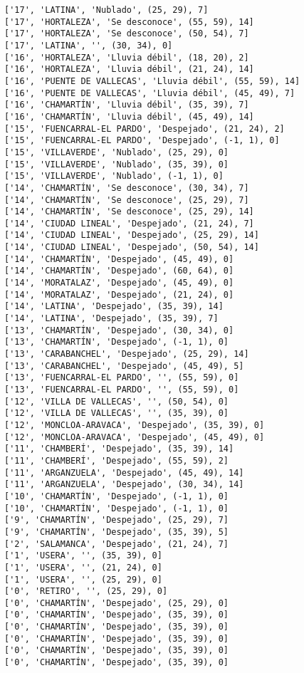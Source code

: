 \documentclass[11pt]{article}
\begin{document}
\begin{Verbatim}[commandchars=\\\{\}]
['17', 'LATINA', 'Nublado', (25, 29), 7]
['17', 'HORTALEZA', 'Se desconoce', (55, 59), 14]
['17', 'HORTALEZA', 'Se desconoce', (50, 54), 7]
['17', 'LATINA', '', (30, 34), 0]
['16', 'HORTALEZA', 'Lluvia débil', (18, 20), 2]
['16', 'HORTALEZA', 'Lluvia débil', (21, 24), 14]
['16', 'PUENTE DE VALLECAS', 'Lluvia débil', (55, 59), 14]
['16', 'PUENTE DE VALLECAS', 'Lluvia débil', (45, 49), 7]
['16', 'CHAMARTÍN', 'Lluvia débil', (35, 39), 7]
['16', 'CHAMARTÍN', 'Lluvia débil', (45, 49), 14]
['15', 'FUENCARRAL-EL PARDO', 'Despejado', (21, 24), 2]
['15', 'FUENCARRAL-EL PARDO', 'Despejado', (-1, 1), 0]
['15', 'VILLAVERDE', 'Nublado', (25, 29), 0]
['15', 'VILLAVERDE', 'Nublado', (35, 39), 0]
['15', 'VILLAVERDE', 'Nublado', (-1, 1), 0]
['14', 'CHAMARTÍN', 'Se desconoce', (30, 34), 7]
['14', 'CHAMARTÍN', 'Se desconoce', (25, 29), 7]
['14', 'CHAMARTÍN', 'Se desconoce', (25, 29), 14]
['14', 'CIUDAD LINEAL', 'Despejado', (21, 24), 7]
['14', 'CIUDAD LINEAL', 'Despejado', (25, 29), 14]
['14', 'CIUDAD LINEAL', 'Despejado', (50, 54), 14]
['14', 'CHAMARTÍN', 'Despejado', (45, 49), 0]
['14', 'CHAMARTÍN', 'Despejado', (60, 64), 0]
['14', 'MORATALAZ', 'Despejado', (45, 49), 0]
['14', 'MORATALAZ', 'Despejado', (21, 24), 0]
['14', 'LATINA', 'Despejado', (35, 39), 14]
['14', 'LATINA', 'Despejado', (35, 39), 7]
['13', 'CHAMARTÍN', 'Despejado', (30, 34), 0]
['13', 'CHAMARTÍN', 'Despejado', (-1, 1), 0]
['13', 'CARABANCHEL', 'Despejado', (25, 29), 14]
['13', 'CARABANCHEL', 'Despejado', (45, 49), 5]
['13', 'FUENCARRAL-EL PARDO', '', (55, 59), 0]
['13', 'FUENCARRAL-EL PARDO', '', (55, 59), 0]
['12', 'VILLA DE VALLECAS', '', (50, 54), 0]
['12', 'VILLA DE VALLECAS', '', (35, 39), 0]
['12', 'MONCLOA-ARAVACA', 'Despejado', (35, 39), 0]
['12', 'MONCLOA-ARAVACA', 'Despejado', (45, 49), 0]
['11', 'CHAMBERÍ', 'Despejado', (35, 39), 14]
['11', 'CHAMBERÍ', 'Despejado', (55, 59), 2]
['11', 'ARGANZUELA', 'Despejado', (45, 49), 14]
['11', 'ARGANZUELA', 'Despejado', (30, 34), 14]
['10', 'CHAMARTÍN', 'Despejado', (-1, 1), 0]
['10', 'CHAMARTÍN', 'Despejado', (-1, 1), 0]
['9', 'CHAMARTÍN', 'Despejado', (25, 29), 7]
['9', 'CHAMARTÍN', 'Despejado', (35, 39), 5]
['2', 'SALAMANCA', 'Despejado', (21, 24), 7]
['1', 'USERA', '', (35, 39), 0]
['1', 'USERA', '', (21, 24), 0]
['1', 'USERA', '', (25, 29), 0]
['0', 'RETIRO', '', (25, 29), 0]
['0', 'CHAMARTÍN', 'Despejado', (25, 29), 0]
['0', 'CHAMARTÍN', 'Despejado', (35, 39), 0]
['0', 'CHAMARTÍN', 'Despejado', (35, 39), 0]
['0', 'CHAMARTÍN', 'Despejado', (35, 39), 0]
['0', 'CHAMARTÍN', 'Despejado', (35, 39), 0]
['0', 'CHAMARTÍN', 'Despejado', (35, 39), 0]
    \end{Verbatim}
    \fi
\end{document}
